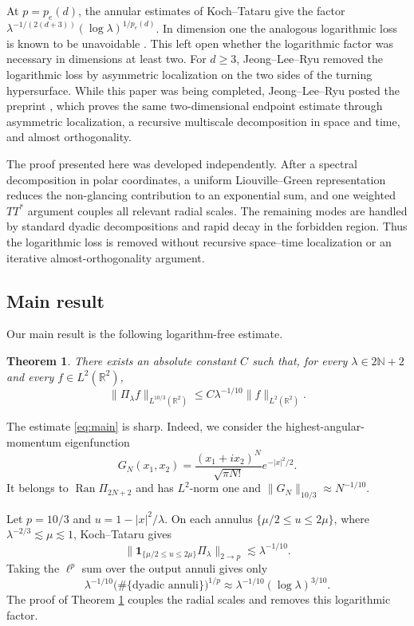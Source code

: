\documentclass[11pt,a4paper]{amsart}
\newtheorem{theorem}{Theorem}[section]
\numberwithin{equation}{section}
\newcommand{\R}{\mathbb R}
\newcommand{\N}{\mathbb N}
\newcommand{\one}{\mathbf 1}
\newcommand{\norm}[1]{\lVert #1\rVert}
\begin{document}
At \(p=p_e(d)\), the annular estimates of Koch--Tataru give the factor
\(\lambda^{-1/(2(d+3))}(\log\lambda)^{1/p_e(d)}\). In dimension one the
analogous logarithmic loss is known to be unavoidable \cite{Markett}. This left
open whether the logarithmic factor was necessary in dimensions at least two.
For \(d\ge3\), Jeong--Lee--Ryu \cite{JLR} removed the logarithmic loss by
asymmetric localization on the two sides of the turning hypersurface. While
this paper was being completed, Jeong--Lee--Ryu posted the preprint
\cite{JLR2D}, which proves the same two-dimensional endpoint estimate through
asymmetric localization, a recursive multiscale decomposition in space and
time, and almost orthogonality.

The proof presented here was developed independently. 
After a spectral decomposition in polar coordinates, a uniform Liouville--Green representation
reduces the non-glancing contribution to an exponential sum, and one
weighted \(TT^*\) argument couples all relevant radial scales. The remaining
modes are handled by standard dyadic decompositions and rapid decay in the
forbidden region. Thus the logarithmic loss is removed without recursive
space--time localization or an iterative almost-orthogonality argument.



\subsection{Main result}
Our main result is the following logarithm-free estimate.

\begin{theorem}\label{thm:main}
There exists an absolute constant \(C\) such that, for every
\(\lambda\in2\N+2\) and every \(f\in L^2(\R^2)\),
\begin{equation}\label{eq:main}
 \norm{\Pi_\lambda f}_{L^{10/3}(\R^2)}
 \le C\lambda^{-1/10}\norm f_{L^2(\R^2)}.
\end{equation}
\end{theorem}

The estimate \eqref{eq:main} is sharp. Indeed,  we consider the  highest-angular-momentum eigenfunction
\[
G_N(x_1,x_2)
=\frac{(x_1+ix_2)^N}{\sqrt{\pi N!}}e^{-|x|^2/2}.
\]
It belongs to \(\operatorname{Ran}\Pi_{2N+2}\) and has \(L^2\)-norm one and 
$
\norm{G_N}_{10/3}\approx N^{-1/10}.
$

Let \(p=10/3\) and \(u=1-|x|^2/\lambda\). On each  annulus
\(\{\mu/2\le u\le2\mu\}\), where
\(\lambda^{-2/3}\lesssim\mu\lesssim1\), 
Koch--Tataru \cite[Theorem~3(a)]{KochTataru} gives
\[
 \norm{\one_{\{\mu/2\le u\le2\mu\}}\Pi_\lambda}_{2\to p}
 \lesssim\lambda^{-1/10}.
\]
Taking the \(\ell^{p}\) sum over the output annuli gives only
\[
 \lambda^{-1/10}
 \bigl(\#\{\text{dyadic annuli}\}\bigr)^{1/p}
 \approx
 \lambda^{-1/10}(\log\lambda)^{3/10}.
\]
The proof of Theorem \ref{thm:main} couples the radial scales and removes this logarithmic
factor.
\end{document}
